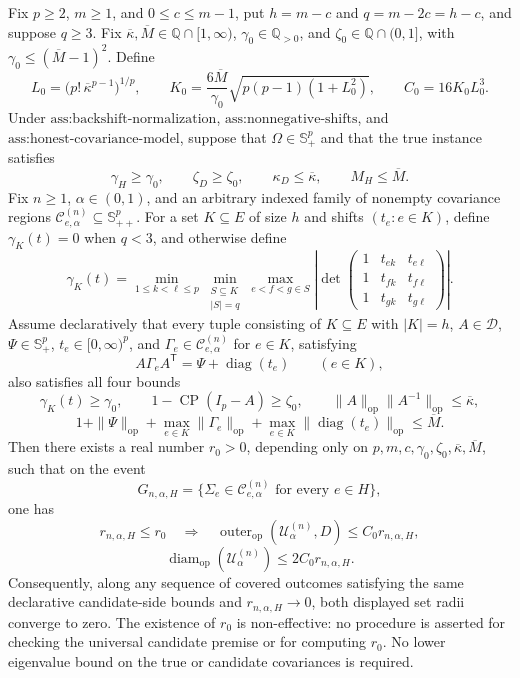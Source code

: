 Fix \(p\geq2\), \(m\geq1\), and \(0\leq c\leq m-1\), put \(h=m-c\) and \(q=m-2c=h-c\), and suppose \(q\geq3\). Fix \(\overline\kappa,\overline M\in\mathbb Q\cap[1,\infty)\), \(\gamma_0\in\mathbb Q_{>0}\), and \(\zeta_0\in\mathbb Q\cap(0,1]\), with \(\gamma_0\leq(\overline M-1)^2\). Define
\[
L_0=\bigl(p!\,\overline\kappa^{p-1}\bigr)^{1/p},
\qquad
K_0=\frac{6\overline M}{\gamma_0}
\sqrt{p(p-1)(1+L_0^2)},
\qquad
C_0=16K_0L_0^3.
\]
Under \(\text{ass:backshift-normalization}\), \(\text{ass:nonnegative-shifts}\), and \(\text{ass:honest-covariance-model}\), suppose that \(\Omega\in\mathbb S_+^p\) and that the true instance satisfies
\[
\gamma_H\geq\gamma_0,\qquad
\zeta_D\geq\zeta_0,\qquad
\kappa_D\leq\overline\kappa,\qquad
M_H\leq\overline M.
\]
Fix \(n\geq1\), \(\alpha\in(0,1)\), and an arbitrary indexed family of nonempty covariance regions \(\mathcal C^{(n)}_{e,\alpha}\subseteq\mathbb S_{++}^{p}\). For a set \(K\subseteq E\) of size \(h\) and shifts \((t_e:e\in K)\), define \(\gamma_K(t)=0\) when \(q<3\), and otherwise define
\[
\gamma_K(t)=
\min_{1\leq k<\ell\leq p}
\min_{\substack{S\subseteq K\\|S|=q}}
\max_{e<f<g\in S}
\left|
\det\begin{pmatrix}
1&t_{ek}&t_{e\ell}\\
1&t_{fk}&t_{f\ell}\\
1&t_{gk}&t_{g\ell}
\end{pmatrix}
\right|.
\]
Assume declaratively that every tuple consisting of \(K\subseteq E\) with \(|K|=h\), \(A\in\mathcal D\), \(\Psi\in\mathbb S_+^p\), \(t_e\in[0,\infty)^p\), and \(\Gamma_e\in\mathcal C^{(n)}_{e,\alpha}\) for \(e\in K\), satisfying
\[
A\Gamma_eA^{\mathsf T}=\Psi+\operatorname{diag}(t_e)
\qquad(e\in K),
\]
also satisfies all four bounds
\[
\gamma_K(t)\geq\gamma_0,
\qquad
1-\operatorname{CP}(I_p-A)\geq\zeta_0,
\qquad
\|A\|_{\mathrm{op}}\|A^{-1}\|_{\mathrm{op}}
\leq\overline\kappa,
\]
\[
1+\|\Psi\|_{\mathrm{op}}
+\max_{e\in K}\|\Gamma_e\|_{\mathrm{op}}
+\max_{e\in K}\|\operatorname{diag}(t_e)\|_{\mathrm{op}}
\leq\overline M.
\]
Then there exists a real number \(r_0>0\), depending only on \(p,m,c,\gamma_0,\zeta_0,\overline\kappa,\overline M\), such that on the event
\[
G_{n,\alpha,H}
=\{\Sigma_e\in\mathcal C^{(n)}_{e,\alpha}\text{ for every }e\in H\},
\]
one has
\[
r_{n,\alpha,H}\leq r_0
\quad\Longrightarrow\quad
\operatorname{outer}_{\mathrm{op}}(\mathcal U^{(n)}_\alpha,D)
\leq C_0r_{n,\alpha,H},
\]
\[
\operatorname{diam}_{\mathrm{op}}(\mathcal U^{(n)}_\alpha)
\leq2C_0r_{n,\alpha,H}.
\]
Consequently, along any sequence of covered outcomes satisfying the same declarative candidate-side bounds and \(r_{n,\alpha,H}\to0\), both displayed set radii converge to zero. The existence of \(r_0\) is non-effective: no procedure is asserted for checking the universal candidate premise or for computing \(r_0\). No lower eigenvalue bound on the true or candidate covariances is required.